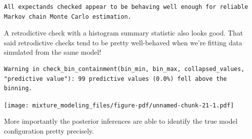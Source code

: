 \documentclass[
  letterpaper,
  DIV=11,
  numbers=noendperiod]{scrartcl}
\newenvironment{Shaded}{\begin{snugshade}}{\end{snugshade}}
\newcommand{\AttributeTok}[1]{\textcolor[rgb]{0.40,0.45,0.13}{#1}}
\newcommand{\DecValTok}[1]{\textcolor[rgb]{0.68,0.00,0.00}{#1}}
\newcommand{\FloatTok}[1]{\textcolor[rgb]{0.68,0.00,0.00}{#1}}
\newcommand{\FunctionTok}[1]{\textcolor[rgb]{0.28,0.35,0.67}{#1}}
\newcommand{\NormalTok}[1]{\textcolor[rgb]{0.00,0.23,0.31}{#1}}
\newcommand{\SpecialCharTok}[1]{\textcolor[rgb]{0.37,0.37,0.37}{#1}}
\newcommand{\StringTok}[1]{\textcolor[rgb]{0.13,0.47,0.30}{#1}}
\begin{document}
\begin{verbatim}
All expectands checked appear to be behaving well enough for reliable
Markov chain Monte Carlo estimation.
\end{verbatim}

A retrodictive check with a histogram summary statistic also looks good.
That said retrodictive checks tend to be pretty well-behaved when we're
fitting data simulated from the same model!

\begin{Shaded}
\end{Shaded}

\begin{verbatim}
Warning in check_bin_containment(bin_min, bin_max, collapsed_values,
"predictive value"): 99 predictive values (0.0%) fell above the binning.
\end{verbatim}

\texttt{[image: mixture\_modeling\_files/figure-pdf/unnamed-chunk-21-1.pdf]}

More importantly the posterior inferences are able to identify the true
model configuration pretty precisely.
\end{document}
